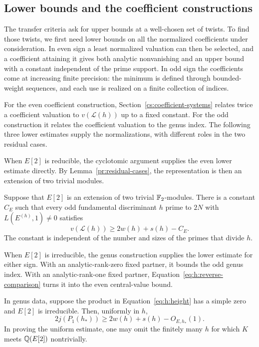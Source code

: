 \subsection{Lower bounds and the coefficient constructions}

The transfer criteria ask for upper bounds at a well-chosen set of
twists. To find those twists, we first need lower bounds on all the
normalized coefficients under consideration. In even sign a least
normalized valuation can then be selected, and a coefficient attaining
it gives both analytic nonvanishing and an upper bound with a constant
independent of the prime support. In odd sign the coefficients come at
increasing finite precision: the minimum is defined through bounded-weight
sequences, and each use is realized on a finite collection of indices.

For the even coefficient construction,
Section~\ref{cs:coefficient-systems} relates twice a coefficient valuation
to $v(\mathcal L(h))$ up to a fixed constant. For the odd construction it
relates the coefficient valuation to the genus index. The following
three lower estimates supply the normalizations, with different roles
in the two residual cases.

When $E[2]$ is reducible, the cyclotomic argument supplies the even
lower estimate directly. By Lemma~\ref{pr:residual-cases}, the
representation is then an extension of two trivial modules.

\begin{theorem}\label{thm:cyclotomic-bound}
Suppose that $E[2]$ is an extension of two trivial $\mathbb F_2$-modules.
There is a constant $C_E$ such that every odd fundamental discriminant
$h$ prime to $2N$ with
$L(E^{(h)},1)\ne0$ satisfies
\begin{equation}\label{eq:cy:lower-bound}
 v(\mathcal L(h))\ge 2w(h)+s(h)-C_E.
\end{equation}
The constant is independent of the number and sizes of the primes
that divide $h$.
\end{theorem}

When $E[2]$ is irreducible, the genus construction supplies the lower
estimate for either sign. With an analytic-rank-zero fixed partner,
it bounds the odd genus index. With an analytic-rank-one fixed
partner, Equation~\eqref{eq:h:reverse-comparison} turns it into the
even central-value bound.

\begin{theorem}\label{thm:heegner-genus-bound}
In genus data, suppose the product in
Equation~\eqref{eq:h:height} has a simple zero and $E[2]$ is irreducible.
Then, uniformly in $h$,
\begin{equation}\label{eq:h:genus-bound}
 2j(P_1(h_*))\ge 2w(h)+s(h)-O_{E,h_*}(1).
\end{equation}
In proving the uniform estimate, one may omit the finitely many $h$ for
which $K$ meets $\mathbb Q(E[2])$ nontrivially.
\end{theorem}

